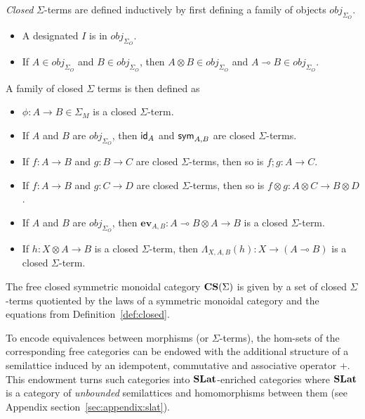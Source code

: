 \begin{definition}
\textit{Closed} $\Sigma$-terms are defined inductively by first defining a family of objects $obj_{\Sigma_{O}}$.
\begin{itemize}
\item A designated $I$ is in $obj_{\Sigma_{O}}$.
\item If $A \in obj_{\Sigma_{O}}$ and $B \in obj_{\Sigma_{O}}$, then $A \otimes B \in obj_{\Sigma_{O}}$ and $A \multimap B \in obj_{\Sigma_{O}}$.
\end{itemize}
A family of closed $\Sigma$ terms is then defined as
\begin{itemize}
    \item $\phi : A \to B \in \Sigma_{M}$ is a closed $\Sigma$-term.
    \item If $A$ and $B$ are $obj_{\Sigma_{O}}$, then $\textsf{id}_{A}$ and $\textsf{sym}_{A,B}$ are closed $\Sigma$-terms.
    \item If $f : A \to B$ and $g : B \to C$ are closed $\Sigma$-terms, then so is $f;g : A \to C$. 
    \item If $f : A \to B$ and $g : C \to D$ are closed $\Sigma$-terms, then so is $f \otimes g : A \otimes C \to B \otimes D$.
    \item If $A$ and $B$ are $obj_{\Sigma_{O}}$, then $\textbf{ev}_{A,B} : A \multimap B \otimes A \to B$ is a closed $\Sigma$-term.
    \item If $h : X \otimes A \to B$ is a closed $\Sigma$-term, then $\Lambda_{X,A,B}(h) : X \to (A \multimap B)$ is a closed $\Sigma$-term.
\end{itemize}
\end{definition}

\begin{definition}
The free closed symmetric monoidal category $\mathbf{CS}(\Sigma)$ is given by a set of closed $\Sigma$-terms quotiented by the laws of a symmetric monoidal category and the equations from Definition~\ref{def:closed}.
\end{definition}

To encode equivalences between morphisms (or $\Sigma$-terms), the hom-sets of the corresponding free categories can be endowed with the additional structure of a semilattice induced by an idempotent, commutative and associative operator $+$.
This endowment turns such categories into $\mathbf{SLat}$-enriched categories where $\mathbf{SLat}$ is a category of \textit{unbounded} semilattices and homomorphisms between them (see Appendix section~\ref{sec:appendix:slat}).

